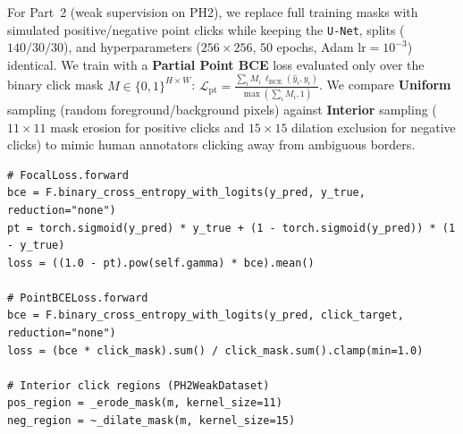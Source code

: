 For Part~2 (weak supervision on PH2), we replace full training masks with simulated positive/negative point clicks while keeping the \texttt{U-Net}, splits ($140/30/30$), and hyperparameters ($256\times256$, $50$ epochs, Adam $\text{lr}=10^{-3}$) identical. We train with a \textbf{Partial Point BCE} loss evaluated only over the binary click mask $M \in \{0,1\}^{H\times W}$:
$\mathcal{L}_{\text{pt}} = \frac{\sum_{i} M_i \,\ell_{\text{BCE}}(\hat{y}_i, y_i)}{\max(\sum_{i} M_i, 1)}$.
We compare \textbf{Uniform} sampling (random foreground/background pixels) against \textbf{Interior} sampling ($11\times11$ mask erosion for positive clicks and $15\times15$ dilation exclusion for negative clicks) to mimic human annotators clicking away from ambiguous borders.
\begin{lstlisting}[caption={Focal, Partial Point BCE (\texttt{losses.py}), and Interior click sampling (\texttt{PH2WeakDataset.py}).}]
# FocalLoss.forward
bce = F.binary_cross_entropy_with_logits(y_pred, y_true, reduction="none")
pt = torch.sigmoid(y_pred) * y_true + (1 - torch.sigmoid(y_pred)) * (1 - y_true)
loss = ((1.0 - pt).pow(self.gamma) * bce).mean()

# PointBCELoss.forward
bce = F.binary_cross_entropy_with_logits(y_pred, click_target, reduction="none")
loss = (bce * click_mask).sum() / click_mask.sum().clamp(min=1.0)

# Interior click regions (PH2WeakDataset)
pos_region = _erode_mask(m, kernel_size=11)
neg_region = ~_dilate_mask(m, kernel_size=15)
\end{lstlisting}
